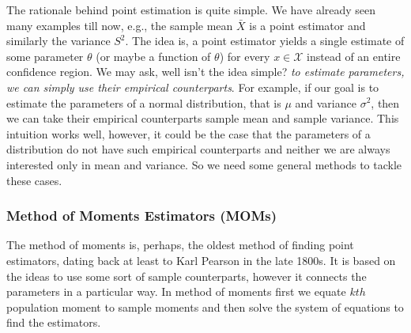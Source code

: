 \documentclass[ 11pt,%
				a4paper,%
				twoside,%
				headinclude,%
				footinclude = true,%
				cleardoublepage = empty,%
				reqno]{scrbook}
\begin{document}
The rationale behind point estimation is quite simple. We have already seen many examples till now, e.g., the sample mean $\bar{X}$ is a point estimator and similarly the variance $S^2$. The idea is, a point estimator yields a single estimate of some parameter $\theta$ (or maybe a function of $\theta$) for every $x \in \mathcal{X}$ instead of an entire confidence region. We may ask, well isn't the idea simple? \emph{to estimate parameters, we can simply use their empirical counterparts}. For example, if our goal is to estimate the parameters of a normal distribution, that is $\mu$ and variance $\sigma^2$, then we can take their empirical counterparts sample mean and sample variance. This intuition works well, however, it could be the case that the parameters of a distribution do not have such empirical counterparts and neither we are always interested only in mean and variance. So we need some general methods to tackle these cases.

\subsubsection{Method of Moments Estimators (MOMs)}

The method of moments is, perhaps, the oldest method of finding point estimators, dating back at least to Karl Pearson in the late 1800s. It is based on the ideas to use some sort of sample counterparts, however it connects the parameters in a particular way. In method of moments first we equate $kth$ population moment to sample moments and then solve the system of equations to find the estimators. 




\end{document}
